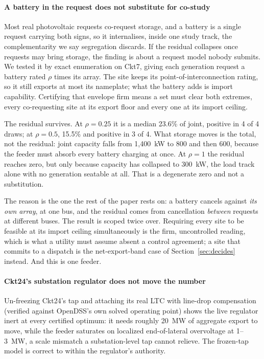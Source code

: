 \documentclass[review,authoryear,12pt]{elsarticle}
\begin{document}
\paragraph{A battery in the request does not substitute for co-study}
Most real photovoltaic requests co-request storage, and a battery is a single
request carrying both signs, so it internalises, inside one study track,
the complementarity we say segregation discards. If the residual collapses
once requests may bring storage, the finding is about a request model nobody
submits. We tested it by exact enumeration on Ckt7, giving each generation
request a battery rated $\rho$ times its array. The site keeps its
point-of-interconnection rating, so it still exports at most its nameplate;
what the battery adds is import capability. Certifying that envelope firm
means a set must clear both extremes, every co-requesting site at its export
floor and every one at its import ceiling.

The residual survives. At $\rho = 0.25$ it is a median 23.6\% of joint,
positive in 4 of 4 draws; at $\rho = 0.5$, 15.5\% and positive in 3 of 4. What
storage moves is the total, not the residual: joint capacity falls from
1{,}400~kW to 800 and then 600, because the feeder must absorb every battery
charging at once. At $\rho = 1$ the residual reaches zero, but only because
capacity has collapsed to 300~kW, the load track alone with no generation
seatable at all. That is a degenerate zero and not a substitution.

The reason is the one the rest of the paper rests on: a battery cancels
against \emph{its own array}, at one bus, and the residual comes from
cancellation \emph{between} requests at different buses. The result is scoped
twice over. Requiring every site to be feasible at its import ceiling
simultaneously is
the firm, uncontrolled reading, which is what a utility must assume absent a
control agreement; a site that commits to a dispatch is the net-export-band
case of Section~\ref{sec:decides} instead. And this is one feeder.

\paragraph{Ckt24's substation regulator does not move the number}
Un-freezing Ckt24's tap and attaching its real LTC with line-drop
compensation (verified against OpenDSS's own solved operating point) shows the live
regulator inert at every certified optimum: it needs roughly 20~MW of
aggregate export to move, while the feeder saturates on localized
end-of-lateral overvoltage at 1--3~MW, a scale mismatch a substation-level
tap cannot relieve. The frozen-tap model is correct to within the regulator's
authority.
\end{document}
